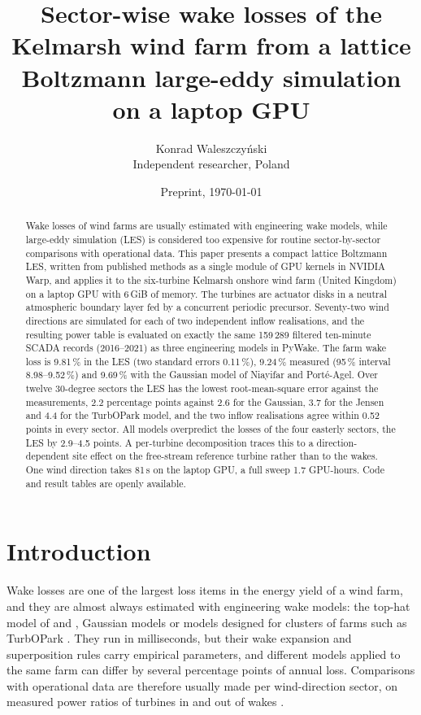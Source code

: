 \documentclass[11pt,a4paper]{article}
\title{Sector-wise wake losses of the Kelmarsh wind farm from a lattice Boltzmann large-eddy simulation on a laptop GPU}
\author{Konrad Waleszczy\'nski\\[2pt]
  \small Independent researcher, Poland}
\date{Preprint, \today}
\begin{document}
\maketitle

\begin{abstract}
Wake losses of wind farms are usually estimated with engineering wake models, while large-eddy simulation (LES)
is considered too expensive for routine sector-by-sector comparisons with operational data. This paper presents a
compact lattice Boltzmann LES, written from published methods as a single module of GPU kernels in NVIDIA Warp,
and applies it to the six-turbine Kelmarsh onshore wind farm (United Kingdom) on a laptop GPU with 6\,GiB of
memory. The turbines are actuator disks in a neutral atmospheric boundary layer fed by a concurrent periodic
precursor. Seventy-two wind directions are simulated for each of two independent inflow realisations, and the
resulting power table is evaluated on exactly the same 159\,289 filtered ten-minute SCADA records (2016--2021) as
three engineering models in PyWake. The farm wake loss is 9.81\,\% in the LES (two standard errors 0.11\,\%),
9.24\,\% measured (95\,\% interval 8.98--9.52\,\%) and 9.69\,\% with the Gaussian model of Niayifar and
Port\'e-Agel. Over twelve 30-degree sectors the LES has the lowest root-mean-square error against the
measurements, 2.2 percentage points against 2.6 for the Gaussian, 3.7 for the Jensen and 4.4 for the TurbOPark
model, and the two inflow realisations agree within 0.52 points in every sector. All models overpredict the
losses of the four easterly sectors, the LES by 2.9--4.5 points. A per-turbine decomposition traces this to a
direction-dependent site effect on the free-stream reference turbine rather than to the wakes. One wind direction
takes 81\,s on the laptop GPU, a full sweep 1.7 GPU-hours. Code and result tables are openly available.
\end{abstract}

\section{Introduction}

Wake losses are one of the largest loss items in the energy yield of a wind farm, and they are almost always
estimated with engineering wake models: the top-hat model of \citet{jensen1983note} and \citet{katic1986cluster},
Gaussian models \citep{bastankhah2014gaussian,niayifar2016analytical} or models designed for clusters of farms
such as TurbOPark \citep{nygaard2020cluster,pedersen2022turbopark}. They run in milliseconds, but their wake
expansion and superposition rules carry empirical parameters, and different models applied to the same farm can
differ by several percentage points of annual loss. Comparisons with operational data are therefore usually made
per wind-direction sector, on measured power ratios of turbines in and out of wakes \citep{barthelmie2009offshore}.
\end{document}
